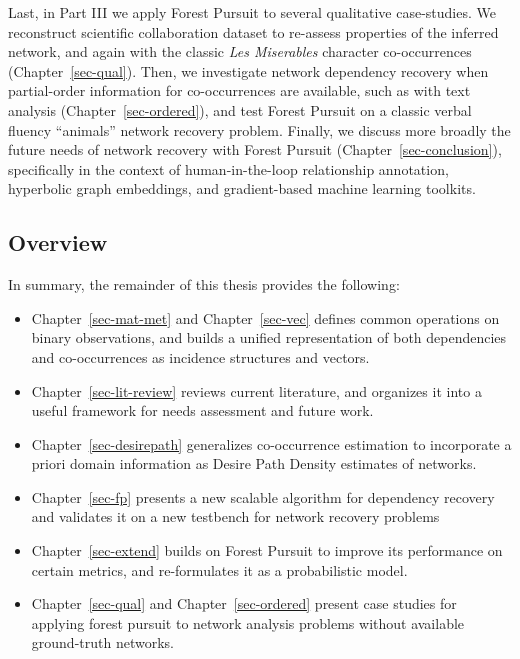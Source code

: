 \documentclass[%
	12pt,
		oneside,
		letterpaper
]{book}
\providecommand{\tightlist}{%
  \setlength{\itemsep}{0pt}\setlength{\parskip}{0pt}}\usepackage{longtable,booktabs,array}
\begin{document}
Last, in Part III we apply Forest Pursuit to several qualitative
case-studies. We reconstruct scientific collaboration dataset to
re-assess properties of the inferred network, and again with the classic
\emph{Les Miserables} character co-occurrences (Chapter~\ref{sec-qual}).
Then, we investigate network dependency recovery when partial-order
information for co-occurrences are available, such as with text analysis
(Chapter~\ref{sec-ordered}), and test Forest Pursuit on a classic verbal
fluency ``animals'' network recovery problem. Finally, we discuss more
broadly the future needs of network recovery with Forest Pursuit
(Chapter~\ref{sec-conclusion}), specifically in the context of
human-in-the-loop relationship annotation, hyperbolic graph embeddings,
and gradient-based machine learning toolkits.

\subsection{Overview}\label{overview}

In summary, the remainder of this thesis provides the following:

\begin{itemize}
\tightlist
\item
  Chapter~\ref{sec-mat-met} and Chapter~\ref{sec-vec} defines common
  operations on binary observations, and builds a unified representation
  of both dependencies and co-occurrences as incidence structures and
  vectors.
\item
  Chapter~\ref{sec-lit-review} reviews current literature, and organizes
  it into a useful framework for needs assessment and future work.
\item
  Chapter~\ref{sec-desirepath} generalizes co-occurrence estimation to
  incorporate a priori domain information as Desire Path Density
  estimates of networks.\\
\item
  Chapter~\ref{sec-fp} presents a new scalable algorithm for dependency
  recovery and validates it on a new testbench for network recovery
  problems
\item
  Chapter~\ref{sec-extend} builds on Forest Pursuit to improve its
  performance on certain metrics, and re-formulates it as a
  probabilistic model.
\item
  Chapter~\ref{sec-qual} and Chapter~\ref{sec-ordered} present case
  studies for applying forest pursuit to network analysis problems
  without available ground-truth networks.
\end{itemize}
\end{document}
